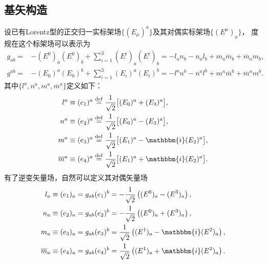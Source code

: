 \subsection{基矢构造}
设已有Lorentz型的正交归一实标架场$\{(E_\mu)^a\}$及其对偶实标架场$\{(E^\mu)_a\}$，
度规在这个标架场可以表示为
\begin{subequations}
    \begin{align}
        g_{ab} = & -(E^0)_a (E^0)_b + \sum\limits_{i=1}^3 {(E^i)_a (E^i)_b }
        = -l_a n_b - n_a l_b + m_a \overline{m}_b + \overline{m}_a {m}_b , \\
        g^{ab} = & -(E_0)^a (E_0)^b + \sum\limits_{i=1}^3 {(E_i)^a (E_i)^b }
        = -l^a n^b - n^a l^b + m^a \overline{m}^b + \overline{m}^a {m}^b .
    \end{align}
\end{subequations}  %
其中$\{l^a, n^a, m^a, \overline{m}^a\}$定义如下\cite[Ch.3]{penrose-Rindler1984}：
\begin{subequations}\label{chnull:eqn_Newman-Penrose-bases}
    \begin{align}
        {l^a} & \equiv (e_1)^a \overset{\mathrm {def}}{=} \frac{1}{\sqrt{2}}
        \bigl[ (E_0)^a + (E_3)^a \bigr] ,   \label{chnull:eqn_Newman-Penrose-base-l} \\
        {n^a} & \equiv (e_2)^a \overset{\mathrm {def}}{=} \frac{1}{\sqrt{2}}
        \bigl[ (E_0)^a - (E_3)^a \bigr] ,  \label{chnull:eqn_Newman-Penrose-base-n}\\
        {m^a} & \equiv (e_3)^a \overset{\mathrm {def}}{=} \frac{1}{\sqrt{2}}
        \bigl[ (E_1)^a - \mathbbm{i} (E_2)^a \bigr]  , \label{chnull:eqn_Newman-Penrose-base-m}\\
        {\overline{m}^a} & \equiv (e_4)^a \overset{\mathrm {def}}{=} \frac{1}{\sqrt{2}}
        \bigl[ (E_1)^a + \mathbbm{i} (E_2)^a \bigr] . \label{chnull:eqn_Newman-Penrose-base-mb}
    \end{align}
\end{subequations}
有了逆变矢量场，自然可以定义其对偶矢量场
\begin{subequations}\label{chnull:eqn_Newman-Penrose-cov-bases}
    \begin{align}
        {l_a}  &\equiv (e_1)_a  = g_{ab} (e_1)^b
        =  -\frac{1}{\sqrt{2}}\left( (E^0)_a - (E^3)_a  \right) , \\
        {n_a}  &\equiv (e_2)_a  = g_{ab} (e_2)^b
        =  -\frac{1}{\sqrt{2}}\left( (E^0)_a + (E^3)_a  \right) , \\
        {m}_a  &\equiv (e_3)_a  = g_{ab} (e_3)^b
        =  \frac{1}{\sqrt{2}}\left( (E^1)_a - \mathbbm{i} (E^2)_a  \right) , \\
        \overline{m}_a  &\equiv (e_4)_a  = g_{ab} (e_4)^b
        =  \frac{1}{\sqrt{2}}\left( (E^1)_a + \mathbbm{i} (E^2)_a  \right) .
    \end{align}
\end{subequations}

